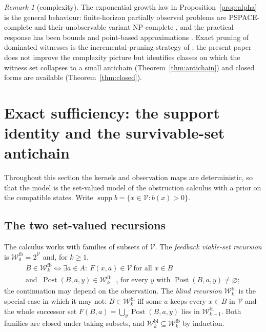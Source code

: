 \documentclass[11pt,a4paper]{article}
\theoremstyle{plain}
\theoremstyle{definition}
\theoremstyle{remark}
\newtheorem{remark}[theorem]{Remark}
\newcommand{\calV}{\mathcal{V}}
\newcommand{\calW}{\mathcal{W}}
\newcommand{\Wfb}{\calW^{\mathrm{fb}}}
\newcommand{\Wbl}{\calW^{\mathrm{bl}}}
\newcommand{\supp}{\operatorname{supp}}
\newcommand{\Post}{\operatorname{Post}}
\begin{document}
\begin{remark}[complexity]\label{rem:complexity}
The exponential growth law in Proposition~\ref{prop:alpha} is the general behaviour: finite-horizon partially observed problems are PSPACE-complete and their unobservable variant NP-complete \cite{PapadimitriouTsitsiklis1987}, and the practical response has been bounds and point-based approximations \cite{Lovejoy1991,Pineau2003}. Exact pruning of dominated witnesses is the incremental-pruning strategy of \cite{Cassandra1997}; the present paper does not improve the complexity picture but identifies classes on which the witness set collapses to a small antichain (Theorem~\ref{thm:antichain}) and closed forms are available (Theorem~\ref{thm:closed}).
\end{remark}
\section{Exact sufficiency: the support identity and the survivable-set antichain}\label{sec:support}

Throughout this section the kernels and observation maps are deterministic, so that the model is the set-valued model of the obstruction calculus with a prior on the compatible states. Write $\supp b=\{x\in\calV:b(x)>0\}$.

\subsection{The two set-valued recursions}

The calculus works with families of subsets of $\calV$. The \emph{feedback viable-set recursion} is $\Wfb_0=2^{\calV}$ and, for $k\ge1$,
\begin{multline*}
B\in\Wfb_k\iff\exists a\in A:\ F(x,a)\in\calV\ \text{for all }x\in B\\ \text{and }\ \Post(B,a,y)\in\Wfb_{k-1}\ \text{for every }y\text{ with }\Post(B,a,y)\neq\varnothing ;
\end{multline*}
the continuation may depend on the observation. The \emph{blind recursion} $\Wbl_k$ is the special case in which it may not: $B\in\Wbl_k$ iff some $a$ keeps every $x\in B$ in $\calV$ and the whole successor set $F(B,a)=\bigcup_y\Post(B,a,y)$ lies in $\Wbl_{k-1}$. Both families are closed under taking subsets, and $\Wbl_k\subseteq\Wfb_k$ by induction.
\end{document}
